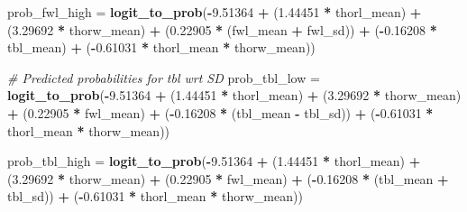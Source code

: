 \documentclass[
]{article}
\newenvironment{Shaded}{\begin{snugshade}}{\end{snugshade}}
\newcommand{\CommentTok}[1]{\textcolor[rgb]{0.56,0.35,0.01}{\textit{#1}}}
\newcommand{\FloatTok}[1]{\textcolor[rgb]{0.00,0.00,0.81}{#1}}
\newcommand{\FunctionTok}[1]{\textcolor[rgb]{0.13,0.29,0.53}{\textbf{#1}}}
\newcommand{\NormalTok}[1]{#1}
\newcommand{\OtherTok}[1]{\textcolor[rgb]{0.56,0.35,0.01}{#1}}
\newcommand{\SpecialCharTok}[1]{\textcolor[rgb]{0.81,0.36,0.00}{\textbf{#1}}}
\begin{document}
\begin{Shaded}
\begin{Highlighting}[]
\NormalTok{prob\_fwl\_high }\OtherTok{=} \FunctionTok{logit\_to\_prob}\NormalTok{(}\SpecialCharTok{{-}}\FloatTok{9.51364} \SpecialCharTok{+} 
\NormalTok{                                (}\FloatTok{1.44451} \SpecialCharTok{*}\NormalTok{ thorl\_mean) }\SpecialCharTok{+} 
\NormalTok{                                (}\FloatTok{3.29692} \SpecialCharTok{*}\NormalTok{ thorw\_mean) }\SpecialCharTok{+} 
\NormalTok{                                (}\FloatTok{0.22905} \SpecialCharTok{*}\NormalTok{ (fwl\_mean }\SpecialCharTok{+}\NormalTok{ fwl\_sd)) }\SpecialCharTok{+} 
\NormalTok{                                (}\SpecialCharTok{{-}}\FloatTok{0.16208} \SpecialCharTok{*}\NormalTok{ tbl\_mean) }\SpecialCharTok{+} 
\NormalTok{                                (}\SpecialCharTok{{-}}\FloatTok{0.61031} \SpecialCharTok{*}\NormalTok{ thorl\_mean }\SpecialCharTok{*}\NormalTok{ thorw\_mean))}

\CommentTok{\# Predicted probabilities for tbl wrt SD}
\NormalTok{prob\_tbl\_low }\OtherTok{=} \FunctionTok{logit\_to\_prob}\NormalTok{(}\SpecialCharTok{{-}}\FloatTok{9.51364} \SpecialCharTok{+} 
\NormalTok{                                (}\FloatTok{1.44451} \SpecialCharTok{*}\NormalTok{ thorl\_mean) }\SpecialCharTok{+} 
\NormalTok{                                (}\FloatTok{3.29692} \SpecialCharTok{*}\NormalTok{ thorw\_mean) }\SpecialCharTok{+} 
\NormalTok{                                (}\FloatTok{0.22905} \SpecialCharTok{*}\NormalTok{ fwl\_mean) }\SpecialCharTok{+} 
\NormalTok{                                (}\SpecialCharTok{{-}}\FloatTok{0.16208} \SpecialCharTok{*}\NormalTok{ (tbl\_mean }\SpecialCharTok{{-}}\NormalTok{ tbl\_sd)) }\SpecialCharTok{+} 
\NormalTok{                                (}\SpecialCharTok{{-}}\FloatTok{0.61031} \SpecialCharTok{*}\NormalTok{ thorl\_mean }\SpecialCharTok{*}\NormalTok{ thorw\_mean))}

\NormalTok{prob\_tbl\_high }\OtherTok{=} \FunctionTok{logit\_to\_prob}\NormalTok{(}\SpecialCharTok{{-}}\FloatTok{9.51364} \SpecialCharTok{+} 
\NormalTok{                                (}\FloatTok{1.44451} \SpecialCharTok{*}\NormalTok{ thorl\_mean) }\SpecialCharTok{+} 
\NormalTok{                                (}\FloatTok{3.29692} \SpecialCharTok{*}\NormalTok{ thorw\_mean) }\SpecialCharTok{+} 
\NormalTok{                                (}\FloatTok{0.22905} \SpecialCharTok{*}\NormalTok{ fwl\_mean) }\SpecialCharTok{+} 
\NormalTok{                                (}\SpecialCharTok{{-}}\FloatTok{0.16208} \SpecialCharTok{*}\NormalTok{ (tbl\_mean }\SpecialCharTok{+}\NormalTok{ tbl\_sd)) }\SpecialCharTok{+} 
\NormalTok{                                (}\SpecialCharTok{{-}}\FloatTok{0.61031} \SpecialCharTok{*}\NormalTok{ thorl\_mean }\SpecialCharTok{*}\NormalTok{ thorw\_mean))}



\end{Highlighting}
\end{Shaded}
\end{document}
